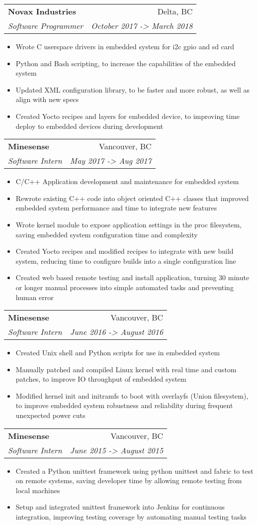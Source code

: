 \documentclass[letterpaper,11pt]{article}
\makeatletter
\newcommand{\resumeItem}[2]{
  \item\small{
    \textbf{#1}{#2 \vspace{-2pt}}
  }
}
\newcommand{\resumeSubheading}[4]{
  \vspace{-1pt}\item
    \begin{tabular*}{0.97\textwidth}[t]{l@{\extracolsep{\fill}}r}
      \textbf{#1} & #2 \\
      \textit{\small#3} & \textit{\small #4} \\
    \end{tabular*}\vspace{-5pt}
}
\newcommand{\resumeItemListStart}{\begin{itemize}}
\newcommand{\resumeItemListEnd}{\end{itemize}\vspace{-5pt}}
\makeatother
\begin{document}
    \resumeSubheading
      {Novax Industries}{Delta, BC}
      {Software Programmer}{October 2017 -> March 2018}
      \resumeItemListStart
        \resumeItem{} {Wrote C userspace drivers in embedded system for i2c gpio and sd card}
        \resumeItem{} {Python and Bash scripting, to increase the capabilities of the embedded system}
        \resumeItem{} {Updated XML configuration library, to be faster and more robust, as well as align with new specs}
        \resumeItem{} {Created Yocto recipes and layers for embedded device, to improving time deploy to embedded devices during development}
      \resumeItemListEnd

    \resumeSubheading
      {Minesense}{Vancouver, BC}
      {Software Intern}{May 2017 -> Aug 2017}
      \resumeItemListStart
        \resumeItem{} {C/C++ Application development and maintenance for embedded system}
        \resumeItem{} {Rewrote existing C++ code into object oriented C++ classes that improved embedded system performance and time to integrate new features}
        \resumeItem{} {Wrote kernel module to expose application settings in the proc filesystem, saving embedded system configuration time and complexity}
        \resumeItem{} {Created Yocto recipes and modified recipes to integrate with new build system, reducing time to configure builds into a single configuration line}
        \resumeItem{} {Created web based remote testing and install application, turning 30 minute or longer manual processes into simple automated tasks and preventing human error}
      \resumeItemListEnd
      
    \bigskip  %

    \resumeSubheading
      {Minesense}{Vancouver, BC}
      {Software Intern}{June 2016 -> August 2016}
      \resumeItemListStart
        \resumeItem{} {Created Unix shell and Python scripts for use in embedded system}
        \resumeItem{} {Manually patched and compiled Linux kernel with real time and custom patches, to improve IO throughput of embedded system}
        \resumeItem{} {Modified kernel init and initramfs to boot with overlayfs (Union filesystem), to improve embedded system robustness and reliability during frequent unexpected power cuts}
      \resumeItemListEnd

    \resumeSubheading
      {Minesense}{Vancouver, BC}
      {Software Intern}{June 2015 -> August 2015}
      \resumeItemListStart
        \resumeItem{} {Created a Python unittest framework using python unittest and fabric to test on remote systems, saving developer time by allowing remote testing from local machines}
        \resumeItem{} {Setup and integrated unittest framework into Jenkins for continuous integration, improving testing coverage by automating manual testing tasks}
      \resumeItemListEnd
\end{document}
